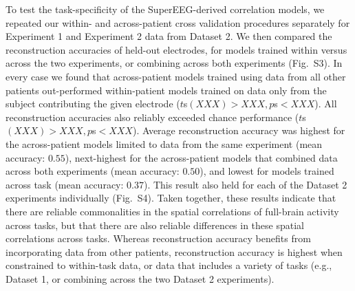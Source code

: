 \documentclass[11pt]{article}
\newcommand{\perexptaskrecon}{S3}
\newcommand{\perexptaskreconseparated}{S4}
\begin{document}
To test the task-specificity of the SuperEEG-derived correlation
models, we repeated our within- and across-patient cross validation
procedures separately for Experiment 1 and Experiment 2 data from
Dataset 2.  We then compared the reconstruction accuracies of held-out
electrodes, for models trained within versus across the two
experiments, or combining across both experiments
(Fig.~\perexptaskrecon).  In every case we found that across-patient
models trained using data from all other patients out-performed
within-patient models trained on data only from the subject
contributing the given electrode ($t$s$(XXX) > XXX, p$s$ < XXX$).  All
reconstruction accuracies also reliably exceeded chance performance
($t$s$(XXX) > XXX, p$s$ < XXX$).  Average reconstruction accuracy was
highest for the across-patient models limited to data from the same
experiment (mean accuracy: $0.55$), next-highest for the
across-patient models that combined data across both experiments (mean
accuracy: $0.50$), and lowest for models trained across task (mean
accuracy: $0.37$).  This result also held for each of the Dataset 2
experiments individually (Fig.~\perexptaskreconseparated).  Taken
together, these results indicate that there are reliable commonalities
in the spatial correlations of full-brain activity across tasks, but
that there are also reliable differences in these spatial correlations
across tasks.  Whereas reconstruction accuracy benefits from
incorporating data from other patients, reconstruction accuracy is
highest when constrained to within-task data, or data that includes a
variety of tasks (e.g., Dataset 1, or combining across the two Dataset
2 experiments).
\end{document}
